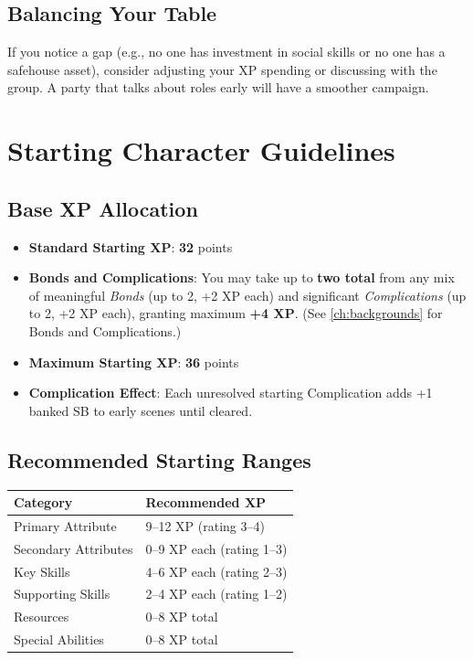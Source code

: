 \subsection*{Balancing Your Table}
If you notice a gap (e.g., no one has investment in social skills or no one has
a safehouse asset), consider adjusting your XP spending or discussing with the
group. A party that talks about roles early will have a smoother campaign.


\section{Starting Character Guidelines}
\label{sec:xp-starting-guidelines}

\subsection*{Base XP Allocation}
\begin{itemize}
\item \textbf{Standard Starting XP}: \textbf{32} points
\item \textbf{Bonds and Complications}: You may take up to \textbf{two total} from any mix of meaningful \emph{Bonds} (up to 2, +2 XP each) and significant \emph{Complications} (up to 2, +2 XP each), granting maximum \textbf{+4 XP}. (See \ref{ch:backgrounds} for Bonds and Complications.)
\item \textbf{Maximum Starting XP}: \textbf{36} points
\item \textbf{Complication Effect}: Each unresolved starting Complication adds +1 banked SB to early scenes until cleared.
\end{itemize}

\subsection*{Recommended Starting Ranges}

\begin{center}
\small
\begin{longtable}{ll}
\toprule
\textbf{Category} & \textbf{Recommended XP} \\
\midrule
Primary Attribute & 9--12 XP (rating 3--4) \\
Secondary Attributes & 0--9 XP each (rating 1--3) \\
Key Skills & 4--6 XP each (rating 2--3) \\
Supporting Skills & 2--4 XP each (rating 1--2) \\
Resources & 0--8 XP total \\
Special Abilities & 0--8 XP total \\
\bottomrule
\end{longtable}
\end{center}

